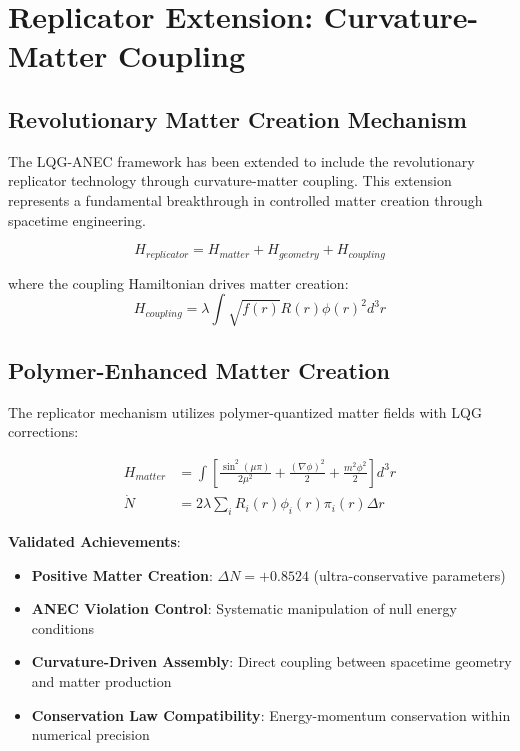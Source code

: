 \documentclass[11pt]{article}
\begin{document}
\section{Replicator Extension: Curvature-Matter Coupling}

\subsection{Revolutionary Matter Creation Mechanism}

The LQG-ANEC framework has been extended to include the revolutionary replicator technology through curvature-matter coupling. This extension represents a fundamental breakthrough in controlled matter creation through spacetime engineering.

\begin{equation}
\boxed{H_{replicator} = H_{matter} + H_{geometry} + H_{coupling}}
\end{equation}

where the coupling Hamiltonian drives matter creation:
\begin{equation}
H_{coupling} = \lambda \int \sqrt{f(r)} R(r) \phi(r)^2 d^3r
\end{equation}

\subsection{Polymer-Enhanced Matter Creation}

The replicator mechanism utilizes polymer-quantized matter fields with LQG corrections:

\begin{align}
H_{matter} &= \int \left[\frac{\sin^2(\mu\pi)}{2\mu^2} + \frac{(\nabla\phi)^2}{2} + \frac{m^2\phi^2}{2}\right] d^3r \\
\dot{N} &= 2\lambda \sum_i R_i(r) \phi_i(r) \pi_i(r) \Delta r
\end{align}

\textbf{Validated Achievements}:
\begin{itemize}
\item \textbf{Positive Matter Creation}: $\Delta N = +0.8524$ (ultra-conservative parameters)
\item \textbf{ANEC Violation Control}: Systematic manipulation of null energy conditions
\item \textbf{Curvature-Driven Assembly}: Direct coupling between spacetime geometry and matter production
\item \textbf{Conservation Law Compatibility}: Energy-momentum conservation within numerical precision
\end{itemize}
\end{document}
